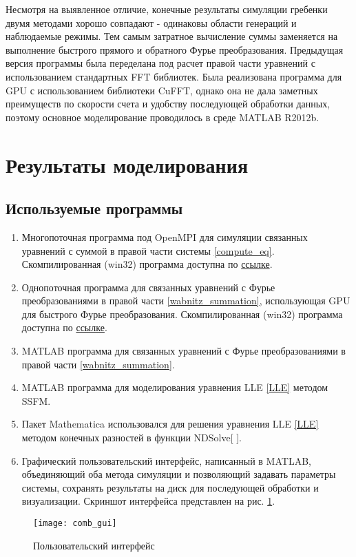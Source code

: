 Несмотря на выявленное отличие, конечные результаты симуляции гребенки двумя методами хорошо совпадают - одинаковы области генераций и наблюдаемые режимы. Тем самым затратное вычисление суммы заменяется на выполнение быстрого прямого и обратного Фурье преобразования. Предыдущая версия программы была переделана под расчет правой части уравнений с использованием стандартных FFT библиотек. Была реализована программа для GPU с использованием библиотеки CuFFT, однако она не дала заметных преимуществ по скорости счета и удобству последующей обработки данных, поэтому основное моделирование проводилось в среде MATLAB R2012b.

\section{Результаты моделирования}
\subsection{Используемые программы}
\begin{enumerate}
\item
Многопоточная программа под OpenMPI для симуляции связанных уравнений с суммой в правой части системы \eqref{compute_eq}. Скомпилированная (win32) программа доступна по \href{https://www.dropbox.com/sh/940djjdx3ojcsxy/_1JZsWTqPN/mpi}{ссылке}.
\item
Однопоточная программа для связанных уравнений с Фурье преобразованиями в правой части \eqref{wabnitz_summation}, использующая GPU для быстрого Фурье преобразования. Скомпилированная (win32) программа доступна по \href{https://www.dropbox.com/sh/940djjdx3ojcsxy/n4hBUtto1o/gpu}{ссылке}.
\item
MATLAB программа для связанных уравнений с Фурье преобразованиями в правой части \eqref{wabnitz_summation}.
\item
MATLAB программа для моделирования уравнения LLE \eqref{LLE} методом SSFM.
\item
Пакет Mathematica использовался для решения уравнения LLE \eqref{LLE} методом конечных разностей в функции NDSolve[ ].
\item Графический пользовательский интерфейс, написанный в MATLAB, объединяющий оба метода симуляции и позволяющий задавать параметры системы, сохранять результаты на диск для последующей обработки и визуализации. Скриншот интерфейса представлен на рис. \ref{comb_gui}.
\end{enumerate}
\begin{figure}
 \centering
 \texttt{[image: comb\_gui]}
 \caption{Пользовательский интерфейс} \label{comb_gui}
\end{figure}

